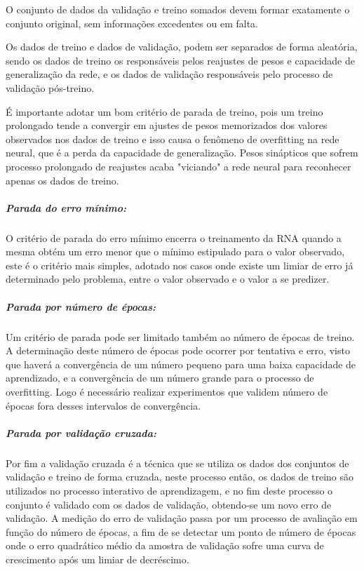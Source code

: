 \documentclass[	12pt, Times, openright, twoside, a4paper, english, brazil]{abntex2}
\begin{document}
            	O conjunto de dados da validação e treino somados devem formar exatamente o conjunto original, sem informações excedentes ou em falta.
            	
            	Os dados de treino e dados de validação, podem ser separados de forma aleatória, sendo os dados de treino os responsáveis pelos reajustes de pesos e capacidade de generalização da rede, e os dados de validação responsáveis pelo processo de validação pós-treino.
            	
            	É importante adotar um bom critério de parada de treino, pois um treino prolongado tende a convergir em ajustes de pesos memorizados dos valores observados nos dados de treino e isso causa o fenômeno de overfitting na rede neural, que é a perda da capacidade de generalização. Pesos sinápticos que sofrem processo prolongado de reajustes acaba "viciando" a rede neural para reconhecer apenas os dados de treino.
            	
            	\subparagraph{ Parada do erro mínimo:}
            	O critério de parada do erro mínimo encerra o treinamento da RNA quando a mesma obtém um erro menor que o mínimo estipulado para o valor observado, este é o critério mais simples, adotado nos casos onde existe um limiar de erro já determinado pelo problema, entre o valor observado e o valor a se predizer.
            	
            	\subparagraph{Parada por número de épocas:}
            	Um critério de parada pode ser limitado também ao número de épocas de treino. A determinação  deste número de épocas pode ocorrer por tentativa e erro, visto que haverá a convergência de um número pequeno para uma baixa capacidade de aprendizado, e a convergência de um número grande para o processo de overfitting. Logo é necessário realizar experimentos que validem número de épocas fora desses intervalos de convergência.
            	
            	\subparagraph{Parada por validação cruzada:}
            	Por fim a validação cruzada é a técnica que se utiliza os dados dos conjuntos de validação e treino de forma cruzada, neste processo então, os dados de treino são utilizados no processo interativo de aprendizagem, e no fim deste processo o conjunto é validado com os dados de validação, obtendo-se um novo erro de validação.
            	A medição do erro de validação passa por um processo de avaliação em função do número de épocas, a fim de se detectar um ponto de número de épocas onde o erro quadrático médio da amostra de validação sofre uma curva de crescimento após um limiar de decréscimo.
            	
\end{document}
